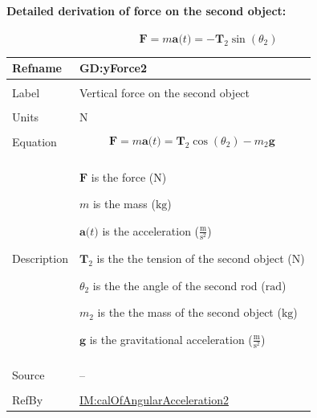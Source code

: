 \documentclass[12pt]{article}
\begin{document}
\paragraph{Detailed derivation of force on the second object:}
\label{GD:xForce2Deriv}
\begin{displaymath}
\symbf{F}=m \symbf{a}\text{(}t\text{)}=-{\symbf{T}_{2}} \sin\left({θ_{2}}\right)
\end{displaymath}
\vspace{\baselineskip}
\noindent
\begin{minipage}{\textwidth}
\begin{tabular}{>{\raggedright}p{}>{\raggedright\arraybackslash}p{}}
\toprule \textbf{Refname} & \textbf{GD:yForce2}
\label{GD:yForce2}
\\ \midrule \\
Label & Vertical force on the second object
        
\\ \midrule \\
Units & ${\text{N}}$
        
\\ \midrule \\
Equation & \begin{displaymath}
           \symbf{F}=m \symbf{a}\text{(}t\text{)}={\symbf{T}_{2}} \cos\left({θ_{2}}\right)-{m_{2}} \symbf{g}
           \end{displaymath}
\\ \midrule \\
Description & \begin{symbDescription}
              \item{$\symbf{F}$ is the force (${\text{N}}$)}
              \item{$m$ is the mass (${\text{kg}}$)}
              \item{$\symbf{a}\text{(}t\text{)}$ is the acceleration ($\frac{\text{m}}{\text{s}^{2}}$)}
              \item{${\symbf{T}_{2}}$ is the the tension of the second object (${\text{N}}$)}
              \item{${θ_{2}}$ is the the angle of the second rod (${\text{rad}}$)}
              \item{${m_{2}}$ is the the mass of the second object (${\text{kg}}$)}
              \item{$\symbf{g}$ is the gravitational acceleration ($\frac{\text{m}}{\text{s}^{2}}$)}
              \end{symbDescription}
\\ \midrule \\
Source & --
         
\\ \midrule \\
RefBy & \hyperref[IM:calOfAngularAcceleration2]{IM:calOfAngularAcceleration2}
        
\\ \bottomrule
\end{tabular}
\end{minipage}
\end{document}
